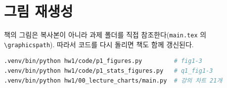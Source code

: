 \section{그림 재생성}
\label{sec:figure-regen}

책의 그림은 복사본이 아니라 과제 폴더를 직접 참조한다(\texttt{main.tex} 의
\texttt{\textbackslash graphicspath}). 따라서 코드를 다시 돌리면 책도 함께
갱신된다.

\begin{lstlisting}[language=bash]
.venv/bin/python hw1/code/p1_figures.py         # fig1-3
.venv/bin/python hw1/code/p1_stats_figures.py   # q1_fig1-3
.venv/bin/python hw1/00_lecture_charts/main.py  # 강의 차트 21개
\end{lstlisting}
